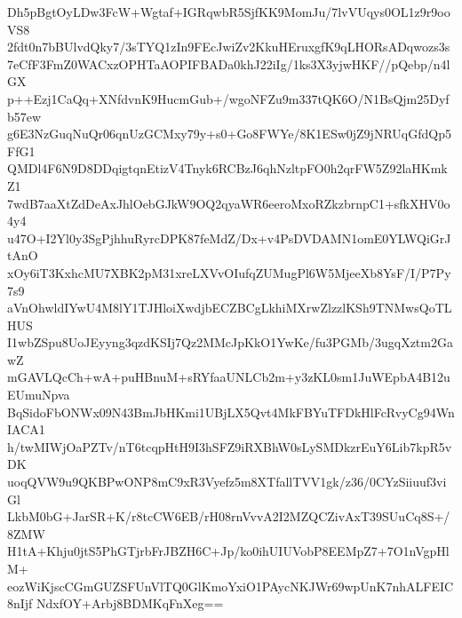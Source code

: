 Dh5pBgtOyLDw3FcW+Wgtaf+IGRqwbR5SjfKK9MomJu/7lvVUqys0OL1z9r9ooVS8
2fdt0n7bBUlvdQky7/3sTYQ1zIn9FEcJwiZv2KkuHEruxgfK9qLHORsADqwozs3s
7eCfF3FmZ0WACxzOPHTaAOPIFBADa0khJ22iIg/1ks3X3yjwHKF//pQebp/n4lGX
p++Ezj1CaQq+XNfdvnK9HucmGub+/wgoNFZu9m337tQK6O/N1BsQjm25Dyfb57ew
g6E3NzGuqNuQr06qnUzGCMxy79y+s0+Go8FWYe/8K1ESw0jZ9jNRUqGfdQp5FfG1
QMDl4F6N9D8DDqigtqnEtizV4Tnyk6RCBzJ6qhNzltpFO0h2qrFW5Z92laHKmkZ1
7wdB7aaXtZdDeAxJhlOebGJkW9OQ2qyaWR6eeroMxoRZkzbrnpC1+sfkXHV0o4y4
u47O+I2Yl0y3SgPjhhuRyrcDPK87feMdZ/Dx+v4PsDVDAMN1omE0YLWQiGrJtAnO
xOy6iT3KxhcMU7XBK2pM31xreLXVvOIufqZUMugPl6W5MjeeXb8YsF/I/P7Py7s9
aVnOhwldIYwU4M8lY1TJHloiXwdjbECZBCgLkhiMXrwZlzzlKSh9TNMwsQoTLHUS
I1wbZSpu8UoJEyyng3qzdKSIj7Qz2MMcJpKkO1YwKe/fu3PGMb/3ugqXztm2GawZ
mGAVLQcCh+wA+puHBnuM+sRYfaaUNLCb2m+y3zKL0sm1JuWEpbA4B12uEUmuNpva
BqSidoFbONWx09N43BmJbHKmi1UBjLX5Qvt4MkFBYuTFDkHlFcRvyCg94WnIACA1
h/twMIWjOaPZTv/nT6tcqpHtH9I3hSFZ9iRXBhW0sLySMDkzrEuY6Lib7kpR5vDK
uoqQVW9u9QKBPwONP8mC9xR3Vyefz5m8XTfallTVV1gk/z36/0CYzSiiuuf3viGl
LkbM0bG+JarSR+K/r8tcCW6EB/rH08rnVvvA2I2MZQCZivAxT39SUuCq8S+/8ZMW
H1tA+Khju0jtS5PhGTjrbFrJBZH6C+Jp/ko0ihUIUVobP8EEMpZ7+7O1nVgpHlM+
eozWiKjscCGmGUZSFUnVlTQ0GlKmoYxiO1PAycNKJWr69wpUnK7nhALFEIC8nIjf
NdxfOY+Arbj8BDMKqFnXeg==
